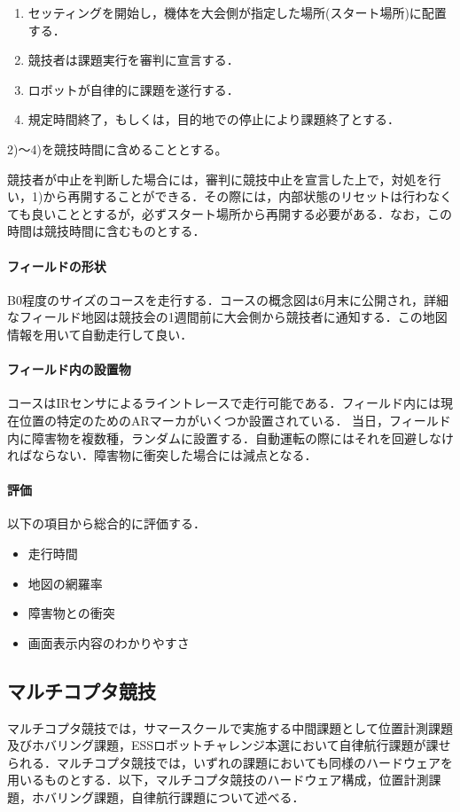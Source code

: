 \documentclass[submit]{ipsj}
\begin{document}
\begin{enumerate}
\item セッティングを開始し，機体を大会側が指定した場所(スタート場所)に配置する．
\item 競技者は課題実行を審判に宣言する．
\item ロボットが自律的に課題を遂行する．
\item 規定時間終了，もしくは，目的地での停止により課題終了とする．
\end{enumerate}

2)〜4)を競技時間に含めることとする。

競技者が中止を判断した場合には，審判に競技中止を宣言した上で，対処を行い，1)から再開することができる．その際には，内部状態のリセットは行わなくても良いこととするが，必ずスタート場所から再開する必要がある．なお，この時間は競技時間に含むものとする．

\paragraph*{フィールドの形状}

B0程度のサイズのコースを走行する．コースの概念図は6月末に公開され，詳細なフィールド地図は競技会の1週間前に大会側から競技者に通知する．この地図情報を用いて自動走行して良い．

\paragraph*{フィールド内の設置物}

コースはIRセンサによるライントレースで走行可能である．フィールド内には現在位置の特定のためのARマーカがいくつか設置されている．
当日，フィールド内に障害物を複数種，ランダムに設置する．自動運転の際にはそれを回避しなければならない．障害物に衝突した場合には減点となる．

\paragraph*{評価}

以下の項目から総合的に評価する．
\begin{itemize}
\item 走行時間
\item 地図の網羅率
\item 障害物との衝突
\item 画面表示内容のわかりやすさ
\end{itemize}

\subsection{マルチコプタ競技}
マルチコプタ競技では，サマースクールで実施する中間課題として位置計測課題及びホバリング課題，ESSロボットチャレンジ本選において自律航行課題が課せられる．マルチコプタ競技では，いずれの課題においても同様のハードウェアを用いるものとする．以下，マルチコプタ競技のハードウェア構成，位置計測課題，ホバリング課題，自律航行課題について述べる．
\end{document}
